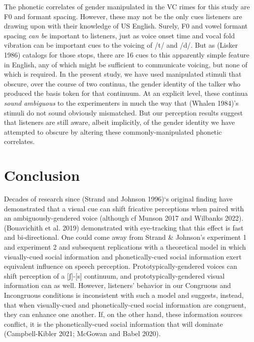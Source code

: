 \documentclass[
  letterpaper,
  DIV=11,
  numbers=noendperiod]{scrartcl}
\begin{document}
The phonetic correlates of gender manipulated in the VC rimes for this
study are F0 and formant spacing. However, these may not be the only
cues listeners are drawing upon with their knowledge of US English.
Surely, F0 and vowel formant spacing \emph{can be} important to
listeners, just as voice onset time and vocal fold vibration can be
important cues to the voicing of /t/ and /d/. But as (Lisker 1986)
catalogs for those stops, there are 16 cues to this apparently simple
feature in English, any of which might be sufficient to communicate
voicing, but none of which is required. In the present study, we have
used manipulated stimuli that obscure, over the course of two continua,
the gender identity of the talker who produced the basis token for that
continuum. At an explicit level, these continua \emph{sound ambiguous}
to the experimenters in much the way that (Whalen 1984)'s stimuli do not
sound obviously mismatched. But our perception results suggest that
listeners are still aware, albeit implicitly, of the gender identity we
have attempted to obscure by altering these commonly-manipulated
phonetic correlates.

\section{Conclusion}\label{conclusion}

Decades of research since (Strand and Johnson 1996)`s original finding
have demonstrated that a visual cue can shift fricative perceptions when
paired with an ambiguously-gendered voice (although cf Munson 2017 and
Wilbanks 2022). (Bouavichith et al. 2019) demonstrated with eye-tracking
that this effect is fast and bi-directional. One could come away from
Strand \& Johnson's experiment 1 and experiment 2 and subsequent
replications with a theoretical model in which visually-cued social
information and phonetically-cued social information exert equivalent
influence on speech perception. Prototypically-gendered voices can shift
perception of a {[}ʃ{]}-{[}s{]} continuum, and prototypically-gendered
visual information can as well. However, listeners' behavior in our
Congruous and Incongruous conditions is inconsistent with such a model
and suggests, instead, that when visually-cued and phonetically-cued
social information are congruent, they can enhance one another. If, on
the other hand, these information sources conflict, it is the
phonetically-cued social information that will dominate (Campbell-Kibler
2021; McGowan and Babel 2020).
\end{document}
